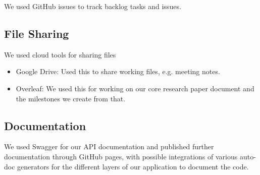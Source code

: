 We used GitHub issues to track backlog tasks and issues.

\subsection{File Sharing}

We used cloud tools for sharing files
\begin{itemize}
    \item Google Drive: Used this to share working files, e.g. meeting notes. 
    \item Overleaf: We used this for working on our core research paper document and the milestones we create from that.
\end{itemize}

\subsection{Documentation}
We used Swagger for our API documentation and published further documentation through GitHub pages, with possible integrations of various auto-doc generators for the different layers of our application to document the code.
